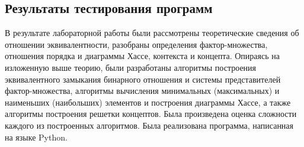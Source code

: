 \documentclass[bachelor, och, labwork]{shiza}
\begin{document}
    \subsection{Результаты тестирования программ}
    



    \newpage
 
    \conclusion
    
    В результате лабораторной работы были рассмотрены теоретические сведения об отношении эквивалентности, разобраны
    определения фактор-множества, отношения порядка и диаграммы Хассе, контекста и концепта. Опираясь на изложенную
    выше теорию, были разработаны алгоритмы построения эквивалентного замыкания бинарного отношения и системы представителей
    фактор-множества, алгоритмы вычисления минимальных (максимальных) и наименьших (наибольших) элементов и построения
    диаграммы Хассе, а также алгоритмы построения решетки концептов. Была произведена оценка сложности каждого из 
    построенных алгоритмов. Была реализована программа, написанная на языке Python.
    
\end{document}
